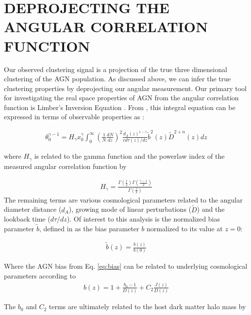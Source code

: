 \documentclass[preprint]{aastex63}
\begin{document}
    \section{DEPROJECTING THE ANGULAR CORRELATION FUNCTION}
    Our observed clustering signal is a projection of the true three dimensional clustering of the AGN population.
    As discussed above, we can infer the true clustering properties by deprojecting our angular measurement. Our primary tool for 
    investigating the real space properties of AGN from the 
    angular correlation function is Limber's Inversion Equation \citep{limber}. 
    From \citet{koutoulidis}, this integral equation can be expressed in terms of 
    observable properties as :
    
    \begin{align}
        \theta_0^{\gamma-1} = H_\gamma x_0^\gamma \int_0^{\infty}\left(\frac{1}{N} \frac{dN}{dz} \right)^2
        \frac{d_A(z)^{1-\gamma}}{cd\tau(z)/dz} \tilde b^{2} (z) \tilde D^{2+n}(z) dz
    \end{align}
    
    where $H_\gamma$ is related to the gamma function and the powerlaw index of the measured angular correlation function by
    
    \begin{align}
        H_\gamma = \frac{\Gamma\left( \frac{1}{2} \right)\Gamma \left( \frac{\gamma - 1}{2} \right)}{\Gamma \left(\frac{\gamma}{2}\right)}
    \end{align} 
    The remaining terms are various cosmological parameters related to the angular diameter distance ($d_A$), growing mode of linear perturbations ($\tilde D$) and the lookback time ($ d\tau / dz$).
    Of interest to this analysis is the normalized bias parameter $\tilde b$, defined in \cite{koutoulidis} as the bias parameter $b$ normalized
    to its value at $z = 0$:
    
    \begin{align}
        \tilde b(z) = \frac{b(z)}{b(0) }
    \end{align}
    
    Where the AGN bias from Eq. \ref{eq:bias} can be related to underlying cosmological parameters according to 
    \begin{align}
        b(z) = 1 + \frac{b_0 - 1}{D(z)} + C_2 \frac{J(z)}{D(z)}
    \end{align}
    
    The $b_0$ and $C_2$ terms are ultimately related to the host dark matter halo mass by
    
\end{document}
